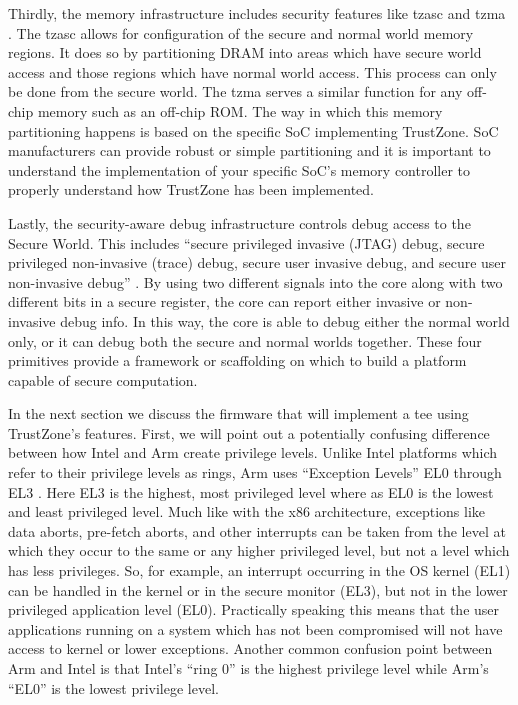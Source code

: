Thirdly, the memory infrastructure includes security features like \gls{tzasc} and \gls{tzma} \cite{TrustZoneExplained}. The \gls{tzasc} allows for configuration of the secure and normal world memory regions. It does so by partitioning DRAM into areas which have secure world access and those regions which have normal world access. This process can only be done from the secure world. The \gls{tzma} serves a similar function for any off-chip memory such as an off-chip ROM. The way in which this memory partitioning happens is based on the specific SoC implementing TrustZone. SoC manufacturers can provide robust or simple partitioning and it is important to understand the implementation of your specific SoC's memory controller to properly understand how TrustZone has been implemented.

Lastly, the security-aware debug infrastructure controls debug access to the Secure World. This includes ``secure privileged invasive (JTAG) debug, secure privileged non-invasive (trace) debug, secure user invasive debug, and secure user non-invasive debug'' \cite{ArmBuildingSS}. By using two different signals into the core along with two different bits in a secure register, the core can report either invasive or non-invasive debug info. In this way, the core is able to debug either the normal world only, or it can debug both the secure and normal worlds together. These four primitives provide a framework or scaffolding on which to build a platform capable of secure computation.

In the next section we discuss the firmware that will implement a \gls{tee} using TrustZone's features. First, we will point out a potentially confusing difference between how Intel and Arm create privilege levels. Unlike Intel platforms which refer to their privilege levels as rings, Arm uses ``Exception Levels'' EL0 through EL3 \cite{armfundv8A}. Here EL3 is the highest, most privileged level where as EL0 is the lowest and least privileged level. Much like with the x86 architecture, exceptions like data aborts, pre-fetch aborts, and other interrupts can be taken from the level at which they occur to the same or any higher privileged level, but not a level which has less privileges. So, for example, an interrupt occurring in the OS kernel (EL1) can be handled in the kernel or in the secure monitor (EL3), but not in the lower privileged application level (EL0). Practically speaking this means that the user applications running on a system which has not been compromised will not have access to kernel or lower exceptions. Another common confusion point between Arm and Intel is that Intel's ``ring 0'' is the highest privilege level while Arm's ``EL0'' is the lowest privilege level.

